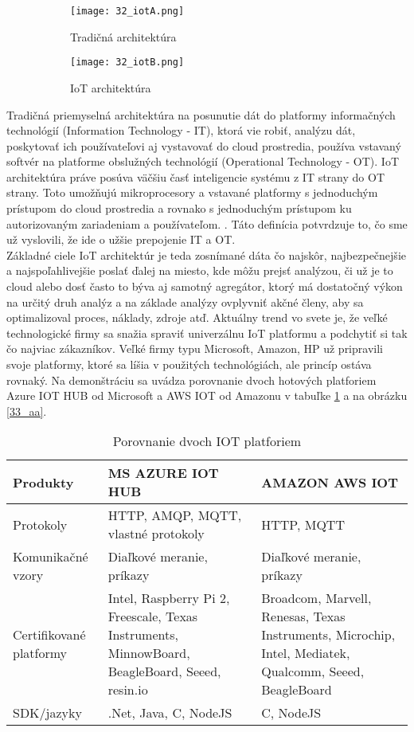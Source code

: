 \begin{figure}[!htbp]
\centering
\begin{subfigure}{0.5\linewidth}
\texttt{[image: 32\_iotA.png]}
\caption{Tradičná architektúra \cite{IOT21}}
\label{32_iotA}
\end{subfigure}%
\begin{subfigure}{0.5\linewidth}
\texttt{[image: 32\_iotB.png]}
\caption{IoT architektúra \cite{IOT21}}
\label{32_iotB}
\end{subfigure}
\caption{}
\end{figure}
Tradičná priemyselná architektúra na posunutie dát do platformy informačných technológií (Information Technology - IT), ktorá vie robiť, analýzu dát, poskytovať ich používateľovi aj vystavovať do cloud prostredia, používa vstavaný softvér na platforme obslužných technológií (Operational Technology - OT). IoT architektúra práve posúva väčšiu časť inteligencie systému z IT strany do OT strany. Toto umožňujú mikroprocesory a vstavané platformy s jednoduchým prístupom do cloud prostredia a rovnako s jednoduchým prístupom ku autorizovaným zariadeniam a používateľom. \cite{IOT21}. Táto definícia potvrdzuje to, čo sme už vyslovili, že ide o užšie prepojenie IT a OT. \\
\indent Základné ciele IoT architektúr je teda zosnímané dáta čo najskôr, najbezpečnejšie a najspoľahlivejšie poslať ďalej na miesto, kde môžu prejsť analýzou, či už je to cloud alebo dosť často to býva aj samotný agregátor, ktorý má dostatočný výkon na určitý druh analýz a na základe analýzy ovplyvniť akčné členy, aby sa optimalizoval proces, náklady, zdroje atď. Aktuálny trend vo svete je, že  veľké technologické firmy sa snažia spraviť univerzálnu IoT platformu a podchytiť si tak čo najviac zákazníkov. Veľké firmy typu Microsoft, Amazon, HP už pripravili svoje platformy, ktoré sa líšia v použitých technológiách, ale princíp ostáva rovnaký. Na demonštráciu sa uvádza porovnanie dvoch hotových platforiem Azure IOT HUB od Microsoft a AWS IOT od Amazonu v tabuľke \ref{table:1} a na obrázku \ref{33_aa}.
\begin{table}[h!]
\centering
 \caption{Porovnanie dvoch IOT platforiem \cite{IOT22} }
 \begin{tabular}{ |p{4cm}|p{5.5cm}p{5.5cm}| } 
 \hline
 Produkty & MS AZURE IOT HUB & AMAZON AWS IOT \\ 
 \hline\hline
 Protokoly & HTTP, AMQP, MQTT, vlastné protokoly & HTTP, MQTT  \\ 
 \hline
 Komunikačné vzory & Diaľkové meranie, príkazy & Diaľkové meranie, príkazy \\
 \hline
 Certifikované platformy &  Intel, Raspberry Pi 2, Freescale, Texas Instruments, MinnowBoard, BeagleBoard, Seeed, resin.io & 
Broadcom, Marvell, Renesas, Texas Instruments, Microchip, Intel, Mediatek, Qualcomm, Seeed, BeagleBoard \\
 \hline
 SDK/jazyky & 	.Net, Java, C, NodeJS & C, NodeJS \\
 \hline
\end{tabular}
\label{table:1}
\end{table}

